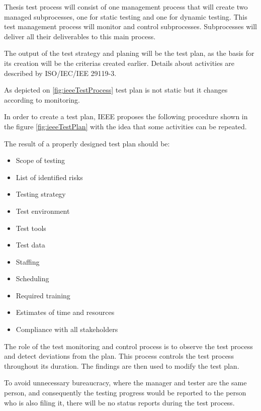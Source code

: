 
Thesis test process will consist of one management process that will create two managed subprocesses, one for static testing and one for dynamic testing. This test management process will monitor and control subprocesses. Subprocesses will deliver all their deliverables to this main process.

The output of the test strategy and planing will be the test plan, as the basis for its creation will be the criterias created earlier. Details about activities are described by ISO/IEC/IEE 29119-3.

As depicted on \ref{fig:ieeeTestProcess} test plan is not static but it changes according to monitoring.


In order to create a test plan, IEEE proposes the following procedure shown in the figure \ref{fig:ieeeTestPlan} with the idea that some activities can be repeated.

The result of a properly designed test plan should be:
\begin{itemize}
    \item Scope of testing
    \item List of identified risks
    \item Testing strategy
    \item Test environment
    \item Test tools
    \item Test data
    \item Staffing
    \item Scheduling
    \item Required training
    \item Estimates of time and resources
    \item Compliance with all stakeholders
\end{itemize}

The role of the test monitoring and control process is to observe the test process and detect deviations from the plan. This process controls the test process throughout its duration. The findings are then used to modify the test plan.

To avoid unnecessary bureaucracy, where the manager and tester are the same person, and consequently the testing progress would be reported to the person who is also filing it, there will be no status reports during the test process.

